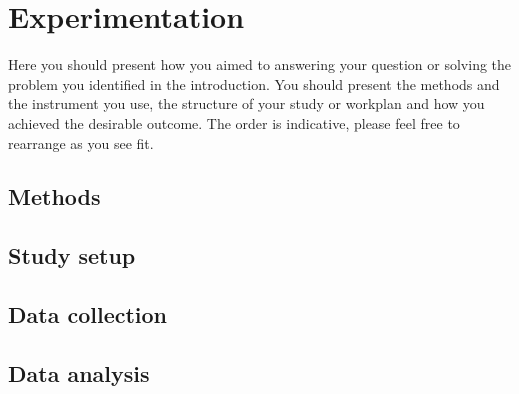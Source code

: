 \chapter{Experimentation}
\label{sec:Experimentation}

Here you should present how you aimed to answering your question or solving the problem you identified in the introduction.
You should present the methods and the instrument you use, the structure of your study or workplan and how you achieved the desirable outcome. The order is indicative, please feel free to rearrange as you see fit.

\section {Methods}
\cite{BASHA2020112}
\cite{jernelv2020convolutional}
\section{Study setup}

\section{Data collection}


\section{Data analysis}

